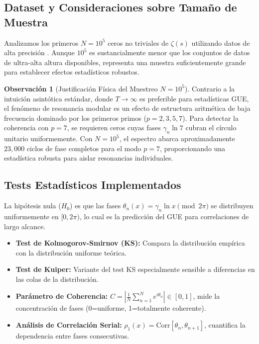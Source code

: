 \documentclass[12pt, a4paper]{article}
\theoremstyle{plain}
\theoremstyle{definition}
\newtheorem{observacion}[teorema]{Observación}
\theoremstyle{remark}
\begin{document}
\subsection{Dataset y Consideraciones sobre Tamaño de Muestra}
\label{subsec:dataset}

Analizamos los primeros $N=10^5$ ceros no triviales de $\zeta(s)$ utilizando datos de alta precisión \cite{gourdon2004, odlyzko2001}. Aunque $10^5$ es sustancialmente menor que los conjuntos de datos de ultra-alta altura disponibles, representa una muestra suficientemente grande para establecer efectos estadísticos robustos.

\begin{observacion}[Justificación Física del Muestreo $N=10^5$]
Contrario a la intuición asintótica estándar, donde $T \to \infty$ es preferible para estadísticas GUE, el fenómeno de resonancia modular es un efecto de estructura aritmética de baja frecuencia dominado por los primeros primos ($p=2, 3, 5, 7$). Para detectar la coherencia con $p=7$, se requieren ceros cuyas fases $\gamma_n \ln 7$ cubran el círculo unitario uniformemente. Con $N=10^5$, el espectro abarca aproximadamente $23,000$ ciclos de fase completos para el modo $p=7$, proporcionando una estadística robusta para aislar resonancias individuales.
\end{observacion}

\subsection{Tests Estadísticos Implementados}
\label{subsec:tests_estadisticos}

La hipótesis nula ($H_0$) es que las fases $\theta_n(x) = \gamma_n \ln x \pmod{2\pi}$ se distribuyen uniformemente en $[0, 2\pi)$, lo cual es la predicción del GUE para correlaciones de largo alcance.

\begin{itemize}
    \item \textbf{Test de Kolmogorov-Smirnov (KS):} Compara la distribución empírica con la distribución uniforme teórica.
    \item \textbf{Test de Kuiper:} Variante del test KS especialmente sensible a diferencias en las colas de la distribución.
    \item \textbf{Parámetro de Coherencia:} $C = \left| \frac{1}{N} \sum_{n=1}^N e^{i\theta_n} \right| \in [0,1]$, mide la concentración de fases (0=uniforme, 1=totalmente coherente).
    \item \textbf{Análisis de Correlación Serial:} $\rho_1(x) = \text{Corr}[\theta_n, \theta_{n+1}]$, cuantifica la dependencia entre fases consecutivas.
\end{itemize}
\end{document}
